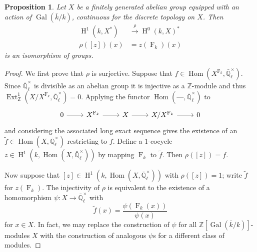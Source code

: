 \documentclass[11pt]{amsart}
\theoremstyle{plain}
\newtheorem{proposition}[theorem]{Proposition}
\theoremstyle{definition}
\theoremstyle{remark}
\newcommand{\ZZ}{{\mathbb{Z}}}
\newcommand{\EE}{\mathbb{\bar Q}_\ell}
\newcommand{\bFq}{\bar{k}}
\newcommand{\Fq}{k}
\newcommand{\EEx}{\EE^\times}
\DeclareMathOperator{\Gal}{Gal}
\newcommand{\Frob}[1]{{\operatorname{F}_{#1}}}
\DeclareMathOperator{\Hom}{Hom}
\DeclareMathOperator{\Ext}{Ext}
\DeclareMathOperator{\Hh}{H}
\begin{document}
\begin{proposition}\label{prop:X}
  Let $X$ be a finitely generated abelian group equipped with an
  action of $\Gal(\bFq/\Fq)$, continuous for the discrete topology on
  $X$.  Then
  \begin{align*}
    \Hh^1(\Fq, X^*) &\xrightarrow{\rho} \Hh^0(\Fq, X)^* \\
    \rho([z])(x) &= z(\Frob{\Fq})(x)
  \end{align*}
  is an isomorphism of groups.
\end{proposition}
\begin{proof}
  We first prove that $\rho$ is surjective.  Suppose that
  $f \in \Hom(X^\Frob{\Fq}, \EEx).$ Since $\EEx$ is divisible
  as an abelian group it is injective as a $\ZZ$-module and thus
  $\Ext^1_{\ZZ}(X/X^\Frob{\Fq}, \EEx) = 0$.  Applying the functor
  $\Hom(\mbox{---}, \EEx)$ to
  \[
  \begin{tikzcd}
  0 \rar & X^\Frob{\Fq} \rar & X \rar & X/X^\Frob{\Fq} \rar & 0
  \end{tikzcd}
  \]
  and considering the associated long exact sequence gives the
  existence of an $\tilde{f} \in \Hom(X, \EEx)$ restricting to
  $f$.  Define a $1$-cocycle $z \in \Hh^1(\Fq, \Hom(X,\EEx))$ by
  mapping $\Frob{\Fq}$ to $\tilde{f}$.  Then $\rho([z]) = f$.

  Now suppose that $[z] \in \Hh^1(\Fq,\Hom(X,\EEx))$ with
  $\rho([z]) = 1$; write $\tilde{f}$ for $z(\Frob{\Fq})$.  The injectivity
  of $\rho$ is equivalent to the existence of a homomorphism $\psi
  \colon X \rightarrow \EEx$ with
  $$\tilde{f}(x) = \frac{\psi(\Frob{\Fq}(x))}{\psi(x)}$$
  for $x \in X$.  In fact, we may replace the construction of $\psi$
  for all $\ZZ[\Gal(\bFq/\Fq)]$-modules $X$ with the construction of
  analogous $\psi$s for a different class of modules.


\end{proof}
\end{document}
